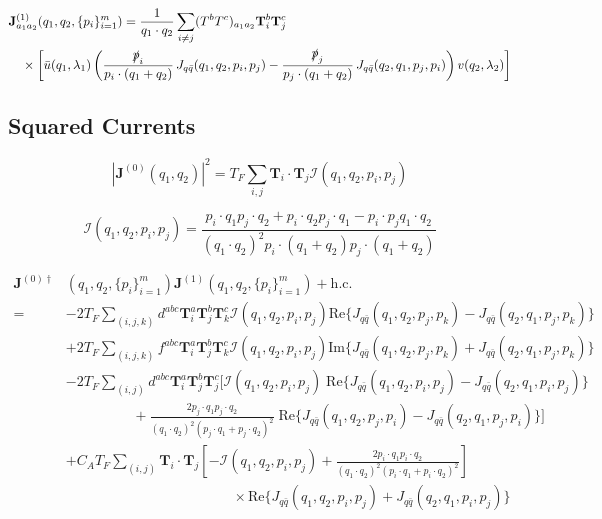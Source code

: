 \documentclass[a4paper,11pt]{article}
\begin{document}
\begin{equation}
\begin{split}
 &\mathbf{J}^{(1)}_{a_1 a_2}(q_1,q_2, \{ p_i \}_{i=1}^m ) =  \frac{1}{q_1 \cdot q_2} \sum_{i\neq j} (T^bT^c)_{a_1a_2} \mathbf{T}^b_i \mathbf{T}^c_j \, \\
  & \quad \times \left[ \bar{u}(q_1,\lambda_1) \left( \frac{\slashed{p}_i}{p_i \cdot (q_1 + q_2)} \, J_{q\bar{q}}(q_1,q_2, p_i, p_j)  - \frac{\slashed{p}_j}{p_j \cdot (q_1 + q_2)} \, J_{q\bar{q}}(q_2,q_1, p_j, p_i) \right) v(q_2,\lambda_2) \right] 
\end{split}
\end{equation}

\subsection{Squared Currents}
\begin{equation}
|\mathbf{J}^{(0)}(q_1, q_2)|^2 = T_F \sum_{i, j} \mathbf{T}_i \cdot \mathbf{T}_j \mathcal{I}(q_1, q_2, p_i, p_j)
\end{equation}

\begin{equation}
\mathcal{I}(q_1, q_2, p_i, p_j) = \frac{p_i \cdot q_1 p_j \cdot q_2 + p_i \cdot q_2 p_j \cdot q_1 - p_i \cdot p_j q_1 \cdot q_2}{(q_1 \cdot q_2)^2 p_i \cdot (q_1 + q_2) p_j \cdot (q_1 + q_2)}
\end{equation}

\begin{equation}
\begin{split}
\mathbf{J}^{(0)\dagger}&(q_1, q_2,\{ p_i \}_{i=1}^m ) \mathbf{J}^{(1)}(q_1, q_2, \{ p_i \}_{i=1}^m ) + \text{h.c.} \\ 
 = &-2T_F \sum_{(i,j,k)} d^{abc} \mathbf{T}_i^a \mathbf{T}_j^b \mathbf{T}_k^c \mathcal{I}(q_1, q_2, p_i, p_j) \text{Re} \big \lbrace J_{q\bar{q}} (q_1, q_2, p_j, p_k) - J_{q \bar{q}}(q_2, q_1, p_j, p_k)  \big \rbrace  \\ 
&  +2T_F \sum_{(i,j,k)} f^{abc} \mathbf{T}_i^a \mathbf{T}_j^b \mathbf{T}_k^c \mathcal{I}(q_1, q_2, p_i, p_j) \text{Im} \big \lbrace J_{q\bar{q}} (q_1, q_2, p_j, p_k) + J_{q \bar{q}}(q_2, q_1, p_j, p_k)  \big \rbrace  \\ 
& - 2T_F \sum_{(i,j)} d^{abc} \mathbf{T}_i^a \mathbf{T}_j^b \mathbf{T}_j^c \bigg [ \mathcal{I}(q_1, q_2, p_i, p_j) \; \text{Re} \bigg \lbrace J_{q \bar{q}} (q_1, q_2, p_i, p_j) - J_{q \bar{q}} (q_2, q_1, p_i, p_j) \bigg \rbrace  \\ 
& \hspace{2cm}  + \frac{2 p_j \cdot q_1 p_j \cdot q_2}{(q_1 \cdot q_2)^2 (p_j \cdot q_1 + p_j \cdot q_2)^2}  \; \text{Re} \bigg \lbrace J_{q \bar{q}} (q_1, q_2, p_j, p_i) - J_{q \bar{q}} (q_2, q_1, p_j, p_i) \bigg \rbrace \bigg ] \\ 
& + C_A T_F \sum_{(i,j)} \mathbf{T}_i \cdot \mathbf{T}_j \left[- \mathcal{I}(q_1, q_2, p_i, p_j) + \frac{2 p_i \cdot q_1 p_i \cdot q_2}{(q_1 \cdot q_2)^2 (p_i \cdot q_1 + p_i \cdot q_2)^2} \right] \\ 
&\hspace{5cm} \times \text{Re} \bigg \lbrace J_{q \bar{q}}(q_1, q_2, p_i, p_j) + J_{q \bar{q}} (q_2, q_1, p_i, p_j) \bigg \rbrace
\end{split}
\end{equation}
\end{document}
